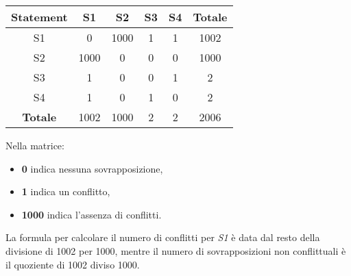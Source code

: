 \begin{center}
\begin{tabular}{|c|c|c|c|c|c|}
\hline
\textbf{Statement} & \textbf{S1} & \textbf{S2} & \textbf{S3} & \textbf{S4} &
\textbf{Totale} \\
\hline
S1 & 0 & 1000 & 1 & 1 & 1002 \\
\hline
S2 & 1000 & 0 & 0 & 0 & 1000 \\
\hline
S3 & 1 & 0 & 0 & 1 & 2 \\
\hline
S4 & 1 & 0 & 1 & 0 & 2 \\
\hline
\textbf{Totale} & 1002 & 1000 & 2 & 2 & 2006 \\
\hline
\end{tabular}
\end{center}

Nella matrice:
\begin{itemize}
    \item \textbf{0} indica nessuna sovrapposizione,
    \item \textbf{1} indica un conflitto,
    \item \textbf{1000} indica l'assenza di conflitti.
\end{itemize}

La formula per calcolare il numero di conflitti per \textit{S1} è data dal resto
della divisione di 1002 per 1000, mentre il numero di sovrapposizioni non conflittuali
è il quoziente di 1002 diviso 1000.
